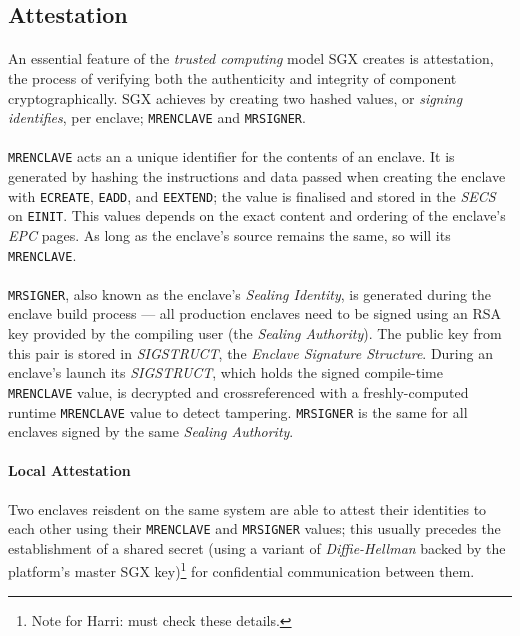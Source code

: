 \subsection{Attestation}
\label{sec:attestation}

\paragraph{} An essential feature of the \textit{trusted computing} model SGX creates is attestation, the process of verifying both the authenticity and integrity of component cryptographically. SGX achieves by creating two hashed values, or \textit{signing identifies}, per enclave; \texttt{MRENCLAVE} and \texttt{MRSIGNER}.

\paragraph{} \texttt{MRENCLAVE} acts an a unique identifier for the contents of an enclave. It is generated by hashing the instructions and data passed when creating the enclave with \texttt{ECREATE}, \texttt{EADD}, and \texttt{EEXTEND}; the value is finalised and stored in the \textit{SECS} on \texttt{EINIT}. This values depends on the exact content and ordering of the enclave's \textit{EPC} pages. As long as the enclave's source remains the same, so will its \texttt{MRENCLAVE}.

\paragraph{} \texttt{MRSIGNER}, also known as the enclave's \textit{Sealing Identity}, is generated during the enclave build process --- all production enclaves need to be signed using an RSA key provided by the compiling user (the \textit{Sealing Authority}). The public key from this pair is stored in \textit{SIGSTRUCT}, the \textit{Enclave Signature Structure}. During an enclave's launch its \textit{SIGSTRUCT}, which holds the signed compile-time \texttt{MRENCLAVE} value, is decrypted and crossreferenced with a freshly-computed runtime \texttt{MRENCLAVE} value to detect tampering. \texttt{MRSIGNER} is the same for all enclaves signed by the same \textit{Sealing Authority}.

\paragraph{Local Attestation} Two enclaves reisdent on the same system are able to attest their identities to each other using their \texttt{MRENCLAVE} and \texttt{MRSIGNER} values; this usually precedes the establishment of a shared secret (using a variant of \textit{Diffie-Hellman} backed by the platform's master SGX key)\footnote{Note for Harri: must check these details.} for confidential communication between them.

